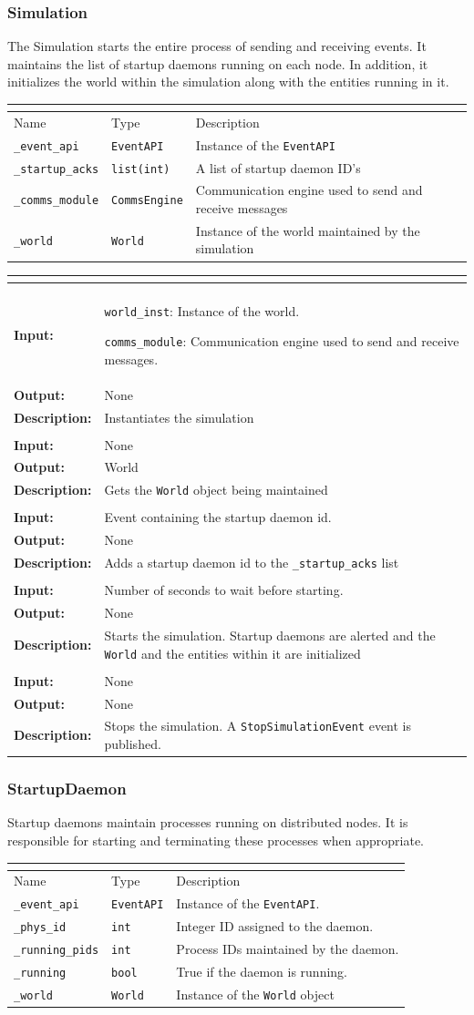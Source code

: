 \documentclass[titlepage]{article}
\renewenvironment{itemize*}
    {\begin{itemize}
        \setlength{\itemsep}{0pt}%
        \setlength{\parskip}{0pt}%
        \setlength{\partopsep}{0pt}%
        \setlength{\topsep}{0pt}}%
    {\end{itemize}}
\newcommand{\operations}[1]{
\begin{center}
    \begin{longtable}{|p{4cm}|p{10cm + 2.0\tabcolsep}|}
    \hline
    \multicolumn{2}{|l|}{\cellcolor[gray]{0.5}{\textbf{Operations}}} \\ \hline
#1
    \end{longtable}
\end{center}
}
\newcommand{\operation}[4]{
    \hline
    \multicolumn{2}{|l|}{\cellcolor[gray]{0.8}{\texttt{#1}}} \\ \hline
    \hspace{7pt}\textbf{Input:} & #2 \\ \hline
    \hspace{7pt}\textbf{Output:} & #3 \\ \hline
    \hspace{7pt}\textbf{Description:} & #4 \\ \hline
}
\newcommand{\attributes}[1]{
    \begin{center}
        \begin{tabular}{|p{3cm}|p{3cm}|p{8cm}|}
            \multicolumn{3}{|l|}{\cellcolor[gray]{0.5}{\textbf{Attributes}}} \\ \hline
            \rowcolor[gray]{0.8} Name & Type & Description \\ \hline 
            #1
        \end{tabular}
    \end{center}
}
\newcommand{\attribute}[3]{
    \texttt{#1} & \texttt{#2} & #3 \\ \hline
}
\begin{document}
\subsubsection{Simulation}
{ The Simulation starts the entire process of sending and receiving events.  It maintains the list of startup daemons running on each node. In addition, it initializes the world within the simulation along with the entities running in it. }

\attributes{
    \attribute{\_event\_api}{EventAPI}{Instance of the \texttt{EventAPI}}
    \attribute{\_startup\_acks}{list(int)}{A list of startup daemon ID's}
    \attribute{\_comms\_module}{CommsEngine}{Communication engine used to send and receive messages}
    \attribute{\_world}{World}{Instance of the world maintained by the simulation}
}

\operations{
    \operation{\_\_init\_\_(world\_inst, comms\_module)}
    {
        \begin{itemize*}
            \item \texttt{world\_inst}: Instance of the world. 
            \item \texttt{comms\_module}: Communication engine used to send and receive messages.
        \end{itemize*}
    }{None}{Instantiates the simulation}
    \operation{get\_world()}{None}{World}{Gets the \texttt{World} object being maintained}
    \operation{get\_on\_ack\_startup(event)}{Event containing the startup daemon id.}{None}{Adds a startup daemon id to the \texttt{\_startup\_acks} list}
    \operation{start(wait)}{Number of seconds to wait before starting.}{None}{Starts the simulation. Startup daemons are alerted and the \texttt{World} and the entities within it are initialized}
    \operation{stop()}{None}{None}{Stops the simulation. A \texttt{StopSimulationEvent} event is published.}
}

\subsubsection{StartupDaemon}
{Startup daemons maintain processes running on distributed nodes. It is responsible for starting and terminating these processes when appropriate.}

\attributes{
    \attribute{\_event\_api}{EventAPI}{Instance of the \texttt{EventAPI}.}
    \attribute{\_phys\_id}{int}{Integer ID assigned to the daemon.}
    \attribute{\_running\_pids}{int}{Process IDs maintained by the daemon.}
    \attribute{\_running}{bool}{True if the daemon is running.}
    \attribute{\_world}{World}{Instance of the \texttt{World} object}
}
\end{document}
